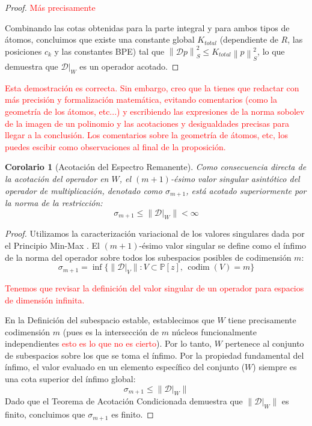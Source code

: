 \documentclass[12pt,a4paper]{article}
\newtheorem{corolario}{Corolario}
\newcommand{\Poly}{\mathbb{P}[z]}
\newcommand{\norm}[1]{\left\| #1 \right\|_S}
\newcommand{\D}{\mathcal{D}}
\begin{document}
\begin{proof}
\textcolor{red}{Más precisamente}

Combinando las cotas obtenidas para la parte integral y para ambos tipos de átomos, concluimos que existe una constante global $K_{total}$ (dependiente de $R$, las posiciones $c_k$ y las constantes BPE) tal que $\norm{\D p}^2 \le K_{total} \norm{p}^2$, lo que demuestra que $\D|_W$ es un operador acotado.
\end{proof}
\textcolor{red}{Esta demostración es correcta. Sin embargo, creo que la tienes que redactar con más precisión y formalización matemática, evitando comentarios (como la geometría de los átomos, etc...) y escribiendo las expresiones de la norma sobolev de la imagen de un polinomio y las acotaciones y desigualdades precisas para llegar a la conclusión. Los comentarios sobre la geometría de átomos, etc, los puedes escibir como observaciones al final de la proposición. }

\begin{corolario}[Acotación del Espectro Remanente]
Como consecuencia directa de la acotación del operador en $W$, el $(m+1)$-ésimo valor singular asintótico del operador de multiplicación, denotado como $\sigma_{m+1}$, está acotado superiormente por la norma de la restricción:
\begin{equation}
    \sigma_{m+1} \le \|\D|_W\| < \infty
\end{equation}
\end{corolario}

\begin{proof}
Utilizamos la caracterización variacional de los valores singulares dada por el Principio Min-Max . El $(m+1)$-ésimo valor singular se define como el ínfimo de la norma del operador sobre todos los subespacios posibles de codimensión $m$:
$$ \sigma_{m+1} = \inf \{ \|\D|_V\| : V \subset \Poly, \, \operatorname{codim}(V) = m \} $$

\textcolor{red}{Tenemos que revisar la definición del valor singular de un operador para espacios de dimensión infinita.}


En la Definición del subespacio estable, establecimos que $W$ tiene precisamente codimensión $m$ (pues es la intersección de $m$ núcleos funcionalmente independientes \textcolor{red}{esto es lo que no es cierto}). Por lo tanto, $W$ pertenece al conjunto de subespacios sobre los que se toma el ínfimo.
Por la propiedad fundamental del ínfimo, el valor evaluado en un elemento específico del conjunto ($W$) siempre es una cota superior del ínfimo global:
$$ \sigma_{m+1} \le \|\D|_W\| $$
Dado que el Teorema de Acotación Condicionada demuestra que $\|\D|_W\|$ es finito, concluimos que $\sigma_{m+1}$ es finito.
\end{proof}
\end{document}
